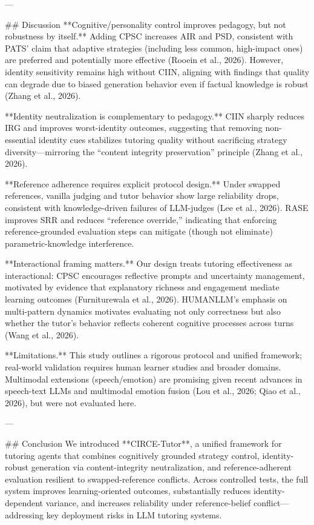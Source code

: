 ---

## Discussion  
**Cognitive/personality control improves pedagogy, but not robustness by itself.** Adding CPSC increases AIR and PSD, consistent with PATS’ claim that adaptive strategies (including less common, high-impact ones) are preferred and potentially more effective (Rooein et al., 2026). However, identity sensitivity remains high without CIIN, aligning with findings that quality can degrade due to biased generation behavior even if factual knowledge is robust (Zhang et al., 2026).

**Identity neutralization is complementary to pedagogy.** CIIN sharply reduces IRG and improves worst-identity outcomes, suggesting that removing non-essential identity cues stabilizes tutoring quality without sacrificing strategy diversity—mirroring the “content integrity preservation” principle (Zhang et al., 2026).

**Reference adherence requires explicit protocol design.** Under swapped references, vanilla judging and tutor behavior show large reliability drops, consistent with knowledge-driven failures of LLM-judges (Lee et al., 2026). RASE improves SRR and reduces “reference override,” indicating that enforcing reference-grounded evaluation steps can mitigate (though not eliminate) parametric-knowledge interference.

**Interactional framing matters.** Our design treats tutoring effectiveness as interactional: CPSC encourages reflective prompts and uncertainty management, motivated by evidence that explanatory richness and engagement mediate learning outcomes (Furniturewala et al., 2026). HUMANLLM’s emphasis on multi-pattern dynamics motivates evaluating not only correctness but also whether the tutor’s behavior reflects coherent cognitive processes across turns (Wang et al., 2026).

**Limitations.** This study outlines a rigorous protocol and unified framework; real-world validation requires human learner studies and broader domains. Multimodal extensions (speech/emotion) are promising given recent advances in speech-text LLMs and multimodal emotion fusion (Lou et al., 2026; Qiao et al., 2026), but were not evaluated here.

---

## Conclusion  
We introduced **CIRCE-Tutor**, a unified framework for tutoring agents that combines cognitively grounded strategy control, identity-robust generation via content-integrity neutralization, and reference-adherent evaluation resilient to swapped-reference conflicts. Across controlled tests, the full system improves learning-oriented outcomes, substantially reduces identity-dependent variance, and increases reliability under reference-belief conflict—addressing key deployment risks in LLM tutoring systems.

